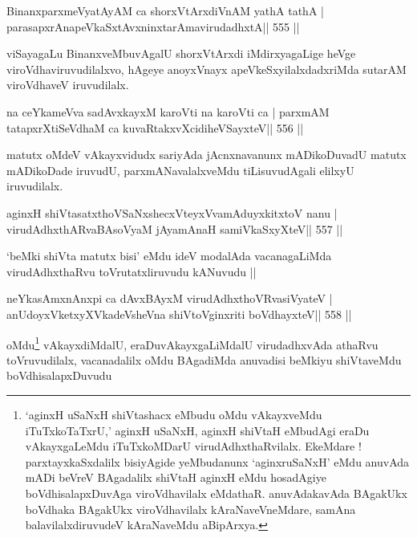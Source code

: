 
\begin{shl}
BinanxparxmeVyatAyAM ca shorxVtArxdiVnAM yathA tathA |
parasapxrAnapeVkaSxtAvxninxtarAmavirudadhxtA\hfill || 555 ||
\end{shl}

\begin{artha}
viSayagaLu BinanxveMbuvAgalU shorxVtArxdi iMdirxyagaLige heVge viroVdhaviruvudilalxvo, hAgeye anoyxVnayx apeVkeSxyilalxdadxriMda sutarAM viroVdhaveV iruvudilalx.
\end{artha}

\begin{shl}
na ceYkameVva sadAvxkayxM karoVti na karoVti ca |
parxmAM tatapxrXtiSeVdhaM ca kuvaRtakxvXcidiheVSayxteV\hfill || 556 ||
\end{shl}

\begin{artha}
matutx oMdeV vAkayxvidudx sariyAda jAcnxnavanunx mADikoDuvadU matutx mADikoDade iruvudU, parxmANavalalxveMdu tiLisuvudAgali elilxyU iruvudilalx.
\end{artha}



\begin{shl}
aginxH shiVtasatxthoVSaNxshecxVteyxVvamAduyxkitxtoV nanu |
virudAdhxthARvaBAsoV\s yaM jAyamAnaH samiVkaSxyXteV\hfill || 557 ||
\end{shl}

\begin{artha}
`beMki shiVta matutx bisi' eMdu ideV modalAda vacanagaLiMda
  virudAdhxthaRvu toVrutatxliruvudu kANuvudu ||

\end{artha}

\begin{shl}
neYkasAmxnAnxpi ca dAvxBAyxM virudAdhxthoVR\s vasiVyateV |
anUdoyxVketxyXVkadeVsheVna shiVtoV\s ginxriti boVdhayxteV\hfill || 558 ||
\end{shl}



\begin{artha}
oMdu\footnote{`aginxH uSaNxH shiVtashacx eMbudu oMdu
  vAkayxveMdu iTuTxkoTaTxrU,' aginxH uSaNxH, aginxH shiVtaH eMbudAgi
  eraDu vAkayxgaLeMdu iTuTxkoMDarU virudAdhxthaRvilalx. EkeMdare !
  parxtayxkaSxdalilx bisiyAgide yeMbudanunx `aginxruSaNxH' eMdu
  anuvAda mADi beVreV BAgadalilx shiVtaH aginxH eMdu hosadAgiye
  boVdhisalapxDuvAga viroVdhavilalx eMdathaR. anuvAdakavAda BAgakUkx
  boVdhaka BAgakUkx viroVdhavilalx kAraNaveVneMdare,
  samAna balavilalxdiruvudeV kAraNaveMdu aBipArxya.} vAkayxdiMdalU, 
  eraDu\footnotemark[\thefootnote]
  vAkayxgaLiMdalU
virudadhxvAda athaRvu toVruvudilalx, vacanadalilx oMdu BAgadiMda
anuvadisi beMkiyu shiVtaveMdu boVdhisalapxDuvudu
\end{artha}

